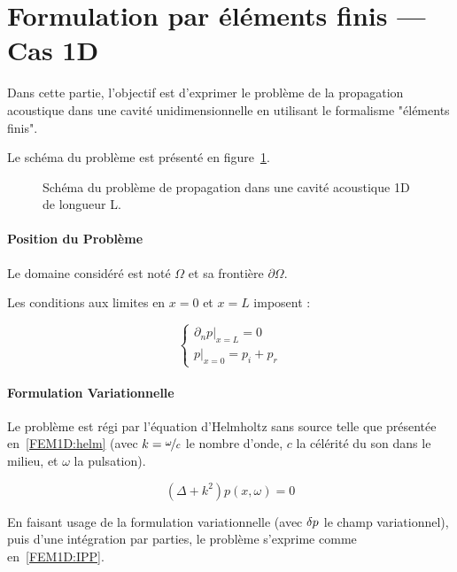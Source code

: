 \section{Formulation par éléments finis --- Cas 1D}

Dans cette partie, l'objectif est d'exprimer le problème de la propagation acoustique dans une cavité unidimensionnelle
en utilisant le formalisme "éléments finis".

Le schéma du problème est présenté en figure~\ref{fig:FEM:propa_1D}.

\begin{figure}[!ht]
	\centering
	
	\caption{\label{fig:FEM:propa_1D}Schéma du problème de propagation dans une cavité acoustique 1D de longueur L.}
\end{figure}

\paragraph{Position du Problème}

Le domaine considéré est noté $\Omega$ et sa frontière $\partial\Omega$.

Les conditions aux limites en $x=0$ et $x=L$ imposent :

\begin{equation}
	\left\{\begin{array}{l}
	\left.\partial_np\right|_{x=L} = 0\\
	\left.p\right|_{x=0} = p_i+p_r
	\end{array}\right. \label{FEM1D:BC}
\end{equation}


\paragraph{Formulation Variationnelle}

Le problème est régi par l'équation d'Helmholtz sans source telle que présentée en~\eqref{FEM1D:helm} (avec $k =
\nicefrac{\omega}{c}$ le nombre d'onde, $c$ la célérité du son dans le milieu, et $\omega$ la pulsation).

\begin{equation}
	(\Delta + k^2)p(x,\omega) = 0 \label{FEM1D:helm}
\end{equation}

En faisant usage de la formulation variationnelle (avec $\delta p$ le champ variationnel), puis d'une intégration par
parties, le problème s'exprime comme en~\eqref{FEM1D:IPP}.

